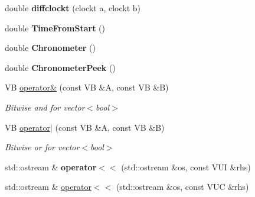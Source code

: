 \begin{DoxyCompactItemize}
\item 
\hypertarget{namespacedscr_a84b32784caf9463edd1d48c169a0f387}{double {\bfseries diffclockt} (clockt a, clockt b)}\label{namespacedscr_a84b32784caf9463edd1d48c169a0f387}

\item 
\hypertarget{namespacedscr_a16b200e54d4dec25384519b87321c1bf}{double {\bfseries Time\-From\-Start} ()}\label{namespacedscr_a16b200e54d4dec25384519b87321c1bf}

\item 
\hypertarget{namespacedscr_abb430c7d91f899467ffada4bbe5ae153}{double {\bfseries Chronometer} ()}\label{namespacedscr_abb430c7d91f899467ffada4bbe5ae153}

\item 
\hypertarget{namespacedscr_a1a1a22ba33368b0bf821df54c5377afd}{double {\bfseries Chronometer\-Peek} ()}\label{namespacedscr_a1a1a22ba33368b0bf821df54c5377afd}

\item 
\hypertarget{namespacedscr_a700bc3316a1f4f6e8c16256161b519db}{V\-B \hyperlink{namespacedscr_a700bc3316a1f4f6e8c16256161b519db}{operator\&} (const V\-B \&A, const V\-B \&B)}\label{namespacedscr_a700bc3316a1f4f6e8c16256161b519db}

\begin{DoxyCompactList}\small\item\em Bitwise and for vector$<$bool$>$ \end{DoxyCompactList}\item 
\hypertarget{namespacedscr_ac20e04e5f20654a2d7b298b8440ab8f6}{V\-B \hyperlink{namespacedscr_ac20e04e5f20654a2d7b298b8440ab8f6}{operator$|$} (const V\-B \&A, const V\-B \&B)}\label{namespacedscr_ac20e04e5f20654a2d7b298b8440ab8f6}

\begin{DoxyCompactList}\small\item\em Bitwise or for vector$<$bool$>$ \end{DoxyCompactList}\item 
\hypertarget{namespacedscr_aa8d9c3d1a253c42368b34749878a1815}{std\-::ostream \& {\bfseries operator$<$$<$} (std\-::ostream \&os, const V\-U\-I \&rhs)}\label{namespacedscr_aa8d9c3d1a253c42368b34749878a1815}

\item 
\hypertarget{namespacedscr_a90c88bd52f1b37a4fcc4d28625108b32}{std\-::ostream \& \hyperlink{namespacedscr_a90c88bd52f1b37a4fcc4d28625108b32}{operator$<$$<$} (std\-::ostream \&os, const V\-U\-C \&rhs)}\label{namespacedscr_a90c88bd52f1b37a4fcc4d28625108b32}


\end{DoxyCompactItemize}
